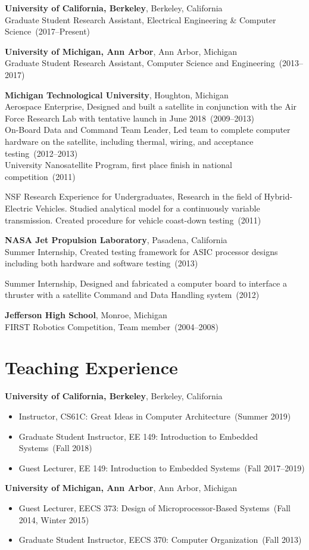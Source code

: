 \documentclass{article}
\begin{document}
{\bf University of California, Berkeley}, Berkeley, California \\
Graduate Student Research Assistant, Electrical Engineering \& Computer Science~(2017--Present)

{\bf University of Michigan, Ann Arbor}, Ann Arbor, Michigan \\
Graduate Student Research Assistant, Computer Science and Engineering~(2013--2017)

{\bf Michigan Technological University}, Houghton, Michigan \\
Aerospace Enterprise, Designed and built a satellite in conjunction with the
Air Force Research Lab with tentative launch in June 2018~(2009--2013) \\
On-Board Data and Command Team Leader, Led team to complete computer hardware
on the satellite, including thermal, wiring, and acceptance testing~(2012--2013) \\
University Nanosatellite Program, first place finish in national competition~(2011)

NSF Research Experience for Undergraduates, Research in the field of
Hybrid-Electric Vehicles. Studied analytical model for a continuously variable
transmission. Created procedure for vehicle coast-down testing~(2011)


{\bf NASA Jet Propulsion Laboratory}, Pasadena, California \\
Summer Internship, Created testing framework for ASIC processor designs
including both hardware and software testing~(2013)

Summer Internship, Designed and fabricated a computer board to interface a
thruster with a satellite Command and Data Handling system~(2012)

{\bf Jefferson High School}, Monroe, Michigan \\
FIRST Robotics Competition, Team member~(2004--2008)


\section*{Teaching Experience}
\vspace{-6pt}
{\bf University of California, Berkeley}, Berkeley, California
\vspace{-6pt}
\begin{itemize}
  \item[] Instructor, CS61C: Great Ideas in Computer Architecture~(Summer 2019)
  \item[] Graduate Student Instructor, EE 149: Introduction to Embedded Systems~(Fall 2018)
  \item[] Guest Lecturer, EE 149: Introduction to Embedded Systems~(Fall 2017--2019)
\end{itemize}
{\bf University of Michigan, Ann Arbor}, Ann Arbor, Michigan
\vspace{-6pt}
\begin{itemize}
  \item[] Guest Lecturer, EECS 373: Design of Microprocessor-Based Systems~(Fall 2014, Winter 2015)
  \item[] Graduate Student Instructor, EECS 370: Computer Organization~(Fall 2013)
\end{itemize}
\end{document}
